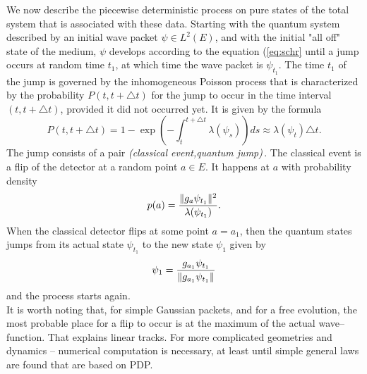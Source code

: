 \documentclass[12pt]{article}
\def\be{\begin{equation}}
\def\ee{\end{equation}}
\begin{document}
We now describe the piecewise deterministic process on pure states of the
total system that is associated with these data. Starting with the quantum
system described by an initial wave packet $\psi\in L^2(E)$, and with the
initial "all off" state of the medium, $\psi$ develops according to the
equation (\ref{eq:schr} until a jump occurs at random time $t_1$, at which
time the wave packet is $\psi_{t_1}$. The time $t_1$ of the jump is
governed by the inhomogeneous Poisson process that is characterized by the
probability $P(t,t+\triangle t)$ for the jump to occur in the time interval
$(t,t+\triangle t)$, provided it did not occurred yet. It is given by the
formula
\be
P(t,t+\triangle t)=1-\exp \left(-\int_t^{t+\triangle t}
\lambda(\psi_s)\right)ds\approx \lambda(\psi_t)\triangle t .
\label{eq:rt}
\ee
The jump consists of a pair {\sl (classical event,quantum jump)}\,. The
classical event is a flip of the detector at a random point $a\in E$. It
happens at $a$ with probability density
\be
p(a)={\Vert g_a \psi_{t_1}\Vert^2\over\lambda(\psi_{t_1})}.
\label{eq:pa}
\ee
 When the classical detector flips at some point $a=a_1$, then the quantum
states jumps from its actual state $\psi_{t_1}$ to the new state $\psi_1$
given by
\be
\psi_1={g_{a_1}\psi_{t_1}\over{\Vert g_{a_1}\psi_{t_1}\Vert}}
\ee
and the process starts again.\\
It is worth noting that, for simple Gaussian packets, and for a free
evolution, the most probable place for a flip to occur is at the maximum of
the actual wave--function. That explains linear tracks. For more
complicated geometries and dynamics -- numerical computation is necessary,
at least until simple general laws are found that are based on PDP.
\end{document}
